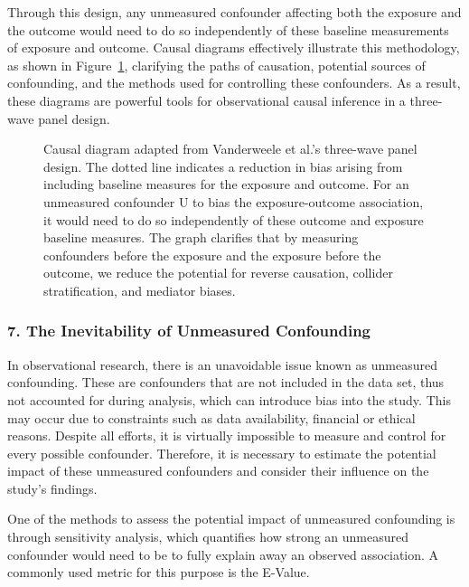 \documentclass[
  singlecolumn]{article}
\begin{document}
Through this design, any unmeasured confounder affecting both the
exposure and the outcome would need to do so independently of these
baseline measurements of exposure and outcome. Causal diagrams
effectively illustrate this methodology, as shown in
Figure~\ref{fig-dag-6}, clarifying the paths of causation, potential
sources of confounding, and the methods used for controlling these
confounders. As a result, these diagrams are powerful tools for
observational causal inference in a three-wave panel design.

\begin{figure}


\caption{\label{fig-dag-6}Causal diagram adapted from Vanderweele et
al.'s three-wave panel design. The dotted line indicates a reduction in
bias arising from including baseline measures for the exposure and
outcome. For an unmeasured confounder U to bias the exposure-outcome
association, it would need to do so independently of these outcome and
exposure baseline measures. The graph clarifies that by measuring
confounders before the exposure and the exposure before the outcome, we
reduce the potential for reverse causation, collider stratification, and
mediator biases.}

\end{figure}%

\subsubsection{7. The Inevitability of Unmeasured
Confounding}\label{the-inevitability-of-unmeasured-confounding}

In observational research, there is an unavoidable issue known as
unmeasured confounding. These are confounders that are not included in
the data set, thus not accounted for during analysis, which can
introduce bias into the study. This may occur due to constraints such as
data availability, financial or ethical reasons. Despite all efforts, it
is virtually impossible to measure and control for every possible
confounder. Therefore, it is necessary to estimate the potential impact
of these unmeasured confounders and consider their influence on the
study's findings.

One of the methods to assess the potential impact of unmeasured
confounding is through sensitivity analysis, which quantifies how strong
an unmeasured confounder would need to be to fully explain away an
observed association. A commonly used metric for this purpose is the
E-Value.
\end{document}
